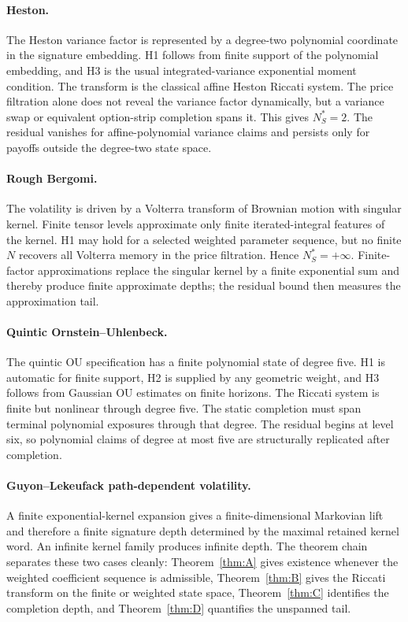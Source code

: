 \documentclass[11pt,oneside]{article}
\theoremstyle{plain}
\theoremstyle{definition}
\theoremstyle{remark}
\begin{document}
\paragraph{Heston.}
The Heston variance factor is represented by a degree-two polynomial coordinate in the signature embedding. H1 follows from finite support of the polynomial embedding, and H3 is the usual integrated-variance exponential moment condition. The transform is the classical affine Heston Riccati system. The price filtration alone does not reveal the variance factor dynamically, but a variance swap or equivalent option-strip completion spans it. This gives $N_S^\ast=2$. The residual vanishes for affine-polynomial variance claims and persists only for payoffs outside the degree-two state space.

\paragraph{Rough Bergomi.}
The volatility is driven by a Volterra transform of Brownian motion with singular kernel. Finite tensor levels approximate only finite iterated-integral features of the kernel. H1 may hold for a selected weighted parameter sequence, but no finite $N$ recovers all Volterra memory in the price filtration. Hence $N_S^\ast=+\infty$. Finite-factor approximations replace the singular kernel by a finite exponential sum and thereby produce finite approximate depths; the residual bound then measures the approximation tail.

\paragraph{Quintic Ornstein--Uhlenbeck.}
The quintic OU specification has a finite polynomial state of degree five. H1 is automatic for finite support, H2 is supplied by any geometric weight, and H3 follows from Gaussian OU estimates on finite horizons. The Riccati system is finite but nonlinear through degree five. The static completion must span terminal polynomial exposures through that degree. The residual begins at level six, so polynomial claims of degree at most five are structurally replicated after completion.

\paragraph{Guyon--Lekeufack path-dependent volatility.}
A finite exponential-kernel expansion gives a finite-dimensional Markovian lift and therefore a finite signature depth determined by the maximal retained kernel word. An infinite kernel family produces infinite depth. The theorem chain separates these two cases cleanly: Theorem~\ref{thm:A} gives existence whenever the weighted coefficient sequence is admissible, Theorem~\ref{thm:B} gives the Riccati transform on the finite or weighted state space, Theorem~\ref{thm:C} identifies the completion depth, and Theorem~\ref{thm:D} quantifies the unspanned tail.
\end{document}
